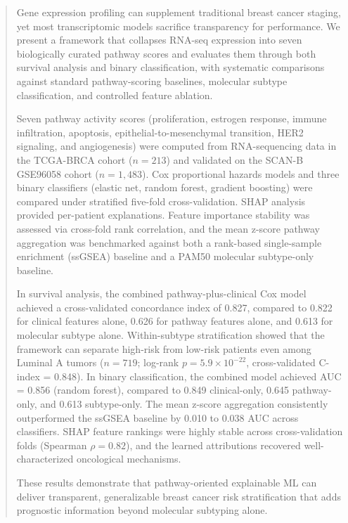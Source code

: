 \documentclass[journal]{IEEEtran}
\begin{document}
\begin{abstract}
Gene expression profiling can supplement traditional breast cancer staging, yet most transcriptomic models sacrifice transparency for performance. We present a framework that collapses RNA-seq expression into seven biologically curated pathway scores and evaluates them through both survival analysis and binary classification, with systematic comparisons against standard pathway-scoring baselines, molecular subtype classification, and controlled feature ablation.

Seven pathway activity scores (proliferation, estrogen response, immune infiltration, apoptosis, epithelial-to-mesenchymal transition, HER2 signaling, and angiogenesis) were computed from RNA-sequencing data in the TCGA-BRCA cohort ($n = 213$) and validated on the SCAN-B GSE96058 cohort ($n = 1{,}483$). Cox proportional hazards models and three binary classifiers (elastic net, random forest, gradient boosting) were compared under stratified five-fold cross-validation. SHAP analysis provided per-patient explanations. Feature importance stability was assessed via cross-fold rank correlation, and the mean z-score pathway aggregation was benchmarked against both a rank-based single-sample enrichment (ssGSEA) baseline and a PAM50 molecular subtype-only baseline.

In survival analysis, the combined pathway-plus-clinical Cox model achieved a cross-validated concordance index of 0.827, compared to 0.822 for clinical features alone, 0.626 for pathway features alone, and 0.613 for molecular subtype alone. Within-subtype stratification showed that the framework can separate high-risk from low-risk patients even among Luminal A tumors ($n = 719$; log-rank $p = 5.9 \times 10^{-22}$, cross-validated C-index = 0.848). In binary classification, the combined model achieved AUC = 0.856 (random forest), compared to 0.849 clinical-only, 0.645 pathway-only, and 0.613 subtype-only. The mean z-score aggregation consistently outperformed the ssGSEA baseline by 0.010 to 0.038 AUC across classifiers. SHAP feature rankings were highly stable across cross-validation folds (Spearman $\rho = 0.82$), and the learned attributions recovered well-characterized oncological mechanisms.

These results demonstrate that pathway-oriented explainable ML can deliver transparent, generalizable breast cancer risk stratification that adds prognostic information beyond molecular subtyping alone.
\end{abstract}
\end{document}

